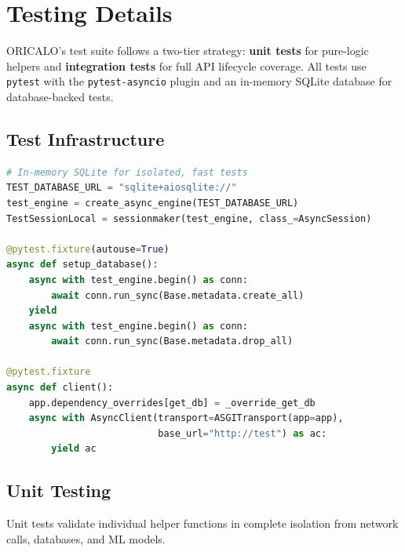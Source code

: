 \section{Testing Details}

ORICALO's test suite follows a two-tier strategy: \textbf{unit tests} for pure-logic helpers and \textbf{integration tests} for full API lifecycle coverage. All tests use \texttt{pytest} with the \texttt{pytest-asyncio} plugin and an in-memory SQLite database for database-backed tests.

\subsection{Test Infrastructure}

\begin{lstlisting}[language=Python, caption={Test Infrastructure Setup (conftest.py excerpt)}, label=lst:conftest]
# In-memory SQLite for isolated, fast tests
TEST_DATABASE_URL = "sqlite+aiosqlite://"
test_engine = create_async_engine(TEST_DATABASE_URL)
TestSessionLocal = sessionmaker(test_engine, class_=AsyncSession)

@pytest.fixture(autouse=True)
async def setup_database():
    async with test_engine.begin() as conn:
        await conn.run_sync(Base.metadata.create_all)
    yield
    async with test_engine.begin() as conn:
        await conn.run_sync(Base.metadata.drop_all)

@pytest.fixture
async def client():
    app.dependency_overrides[get_db] = _override_get_db
    async with AsyncClient(transport=ASGITransport(app=app),
                           base_url="http://test") as ac:
        yield ac
\end{lstlisting}

\subsection{Unit Testing}

Unit tests validate individual helper functions in complete isolation from network calls, databases, and ML models.


